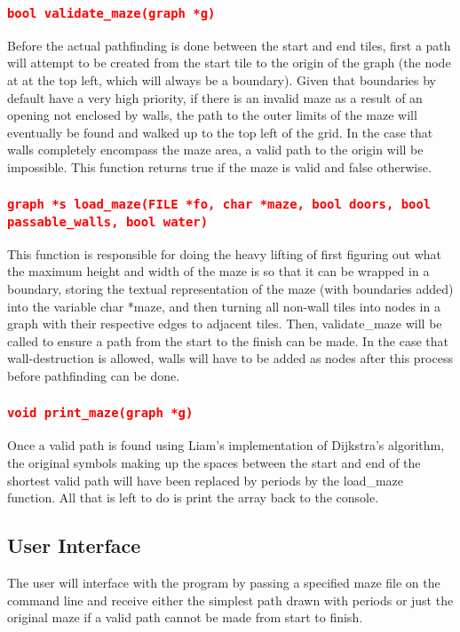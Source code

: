 \documentclass[11pt]{report}
\begin{document}
\subsubsection*{\texttt{\textcolor{red}{bool validate\_maze(graph *g)}}}
Before the actual pathfinding is done between the start and end tiles, first a path will attempt to be created from the start tile to the origin of the graph (the node at at the top left, which will always be a boundary). Given that boundaries by default have a very high priority, if there is an invalid maze as a result of an opening not enclosed by walls, the path to the outer limits of the maze will eventually be found and walked up to the top left of the grid. In the case that walls completely encompass the maze area, a valid path to the origin will be impossible. This function returns true if the maze is valid and false otherwise.
\raggedright\subsubsection*{\texttt{\textcolor{red}{graph *s load\_maze(FILE *fo, char *maze, bool doors, bool passable\_walls, bool water)}}}
This function is responsible for doing the heavy lifting of first figuring out what the maximum height and width of the maze is so that it can be wrapped in a boundary, storing the textual representation of the maze (with boundaries added) into the variable char *maze, and then turning all non-wall tiles into nodes in a graph with their respective edges to adjacent tiles. Then, validate\_maze will be called to ensure a path from the start to the finish can be made. In the case that wall-destruction is allowed, walls will have to be added as nodes after this process before pathfinding can be done.
\subsubsection*{\texttt{\textcolor{red}{void print\_maze(graph *g)}}}
Once a valid path is found using Liam's implementation of Dijkstra's algorithm, the original symbols making up the spaces between the start and end of the shortest valid path will have been replaced by periods by the load\_maze function. All that is left to do is print the array back to the console.
\pagebreak
\vspace*{\fill}
\begin{center}
\section*{User Interface}
The user will interface with the program by passing a specified maze file on the command line and receive either the simplest path drawn with periods or just the original maze if a valid path cannot be made from start to finish.
\end{center}
\vfill
\pagebreak
\end{document}
